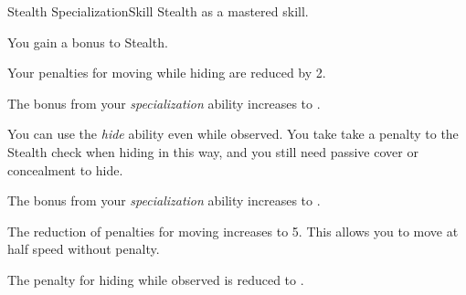     \begin{feat}{Stealth Specialization}{Skill}
        \featpre Stealth as a mastered skill.

        \ff{}

         You gain a  bonus to Stealth.

         Your penalties for moving while hiding are reduced by 2. 

         The bonus from your \textit{specialization} ability increases to .

         You can use the \textit{hide} ability even while observed.
        You take take a  penalty to the Stealth check when hiding in this way, and you still need passive cover or concealment to hide.

         The bonus from your \textit{specialization} ability increases to .

         The reduction of penalties for moving increases to 5.
        This allows you to move at half speed without penalty.

         The penalty for hiding while observed is reduced to .
    \end{feat}

